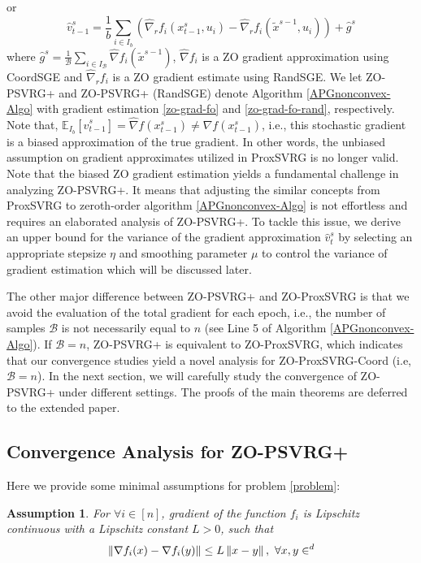 \documentclass[iicol,sn-basic]{sn-jnl}
\theoremstyle{thmstyleone}%
\theoremstyle{thmstyletwo}%
\theoremstyle{thmstylethree}%
\let\R\relax
\newcommand*{\R}{\mathbb{R}}
\newcommand*{\E}{\mathbb{E}}
\newcommand{\norm}[1]{\left\lVert#1\right\rVert}
\newtheorem{assumption}{Assumption}
\begin{document}
or 
\begin{equation}\label{zo-grad-fo-rand}
{\hat{v}}_{t-1}^s = \frac{1}{b} \sum_{i\in I_b}\left(\hat{\nabla}_r f_{i}(x_{t-1}^s, u_i)-\hat{\nabla}_r f_{i}(\tilde{x}^{s-1}, u_i)\right)+\hat{g}^s
\end{equation}
where $\hat{g}^s= \frac{1}{\mathcal{B}}\sum_{i\in I_{\mathcal{B}}}\hat{\nabla} f_{i}(\tilde{x}^{s-1})$,   $\hat{\nabla} f_{i}$ is a ZO gradient approximation using CoordSGE and $\hat{\nabla}_r f_{i}$ is a ZO gradient estimate using RandSGE.  We let ZO-PSVRG+ and ZO-PSVRG+ (RandSGE) denote Algorithm \ref{APGnonconvex-Algo} with gradient estimation \eqref{zo-grad-fo} and 
\eqref{zo-grad-fo-rand}, respectively. 
Note that, $\E_{I_b}[\hat{v}_{t-1}^s] = \hat{\nabla} f(x_{t-1}^s) \neq {\nabla} f(x_{t-1}^s)$, i.e., this stochastic gradient is a biased approximation of the true gradient.
In other words, the unbiased assumption on gradient approximates utilized in ProxSVRG \cite{reddi2016proximal,li2018simple} is no longer valid. Note that the biased ZO gradient estimation yields a fundamental challenge in analyzing ZO-PSVRG+. It means that adjusting the similar concepts from ProxSVRG to zeroth-order algorithm \ref{APGnonconvex-Algo} is not effortless and requires an elaborated analysis of ZO-PSVRG+. To tackle this issue, we derive an upper bound for the variance of the gradient approximation $\hat{v}_t^s$ by selecting an appropriate stepsize $\eta$ and smoothing parameter $\mu$ to control
the variance of gradient estimation which will be discussed later.

The other major difference between ZO-PSVRG+ and ZO-ProxSVRG is that we avoid the evaluation of the total gradient for each epoch, i.e., the number of samples $\mathcal{B}$ is not necessarily equal to $n$ (see Line 5 of Algorithm \ref{APGnonconvex-Algo}).  If $\mathcal{B} = n$, ZO-PSVRG+ is equivalent to ZO-ProxSVRG, which indicates that our convergence studies yield a novel analysis for ZO-ProxSVRG-Coord (i.e, $\mathcal{B} = n$). In the next section, we will carefully study the convergence of ZO-PSVRG+ under different settings. The proofs of the main theorems are deferred to the extended paper.  

\subsection{Convergence Analysis for ZO-PSVRG+}
Here we provide some
minimal assumptions for problem \eqref{problem}:
\begin{assumption}\label{Lip-Zoo}
For $\forall i\in [n]$, gradient of the function $f_i$ is Lipschitz continuous with a Lipschitz constant $L > 0$, such that 
\[
\norm{\nabla f_i(x) - \nabla f_i(y)}\leq L \norm{x-y},\,\,\forall x,y\in\R^d
\]
\end{assumption}
\end{document}
